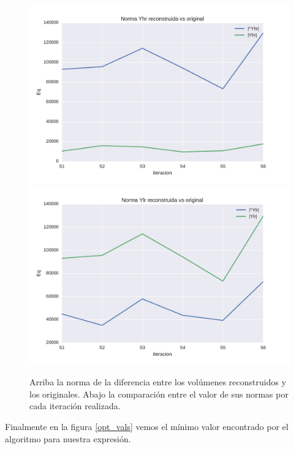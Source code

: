 \documentclass[a4paper,10pt]{article}%
\begin{document}
\begin{figure}[H]
\includegraphics[scale=0.4]{cmp_normas_yhr.pdf}
\includegraphics[scale=0.4]{cmp_normas_ylr.pdf}
\caption{Arriba la norma de la diferencia entre los volúmenes reconstruidos y los originales. Abajo la comparación 
entre el valor de sus normas por cada iteración realizada. }
\label{error_norma}
\end{figure}


Finalmente en la figura \ref{opt_vals} vemos el mínimo valor encontrado por el algoritmo para nuestra expresión.
\end{document}
